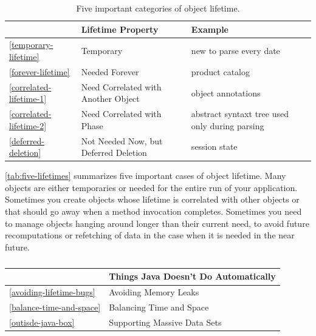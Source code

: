 \begin{table}
\centering
	\begin{tabular}{lp{}p{}}
	\toprule  & Lifetime Property & Example \\ \midrule
	\autoref{temporary-lifetime}  & {Temporary} & new
	\class{SimpleDateFormat} to parse every date
	\\
	\autoref{forever-lifetime} & {Needed Forever} & product catalog
	\\
	\autoref{correlated-lifetime-1} & {Need Correlated with Another Object}
	& object annotations
	\\
	\autoref{correlated-lifetime-2} & {Need Correlated with Phase} &
	abstract syntaxt tree used only during parsing
	\\
	\autoref{deferred-deletion} & {Not Needed Now, but Deferred Deletion} &
	session state \\
	\bottomrule
	\end{tabular}
	\caption{Five important categories of object lifetime.}
	\label{tab:five-lifetimes}
\end{table}

\autoref{tab:five-lifetimes} summarizes five important cases of object lifetime.
Many objects are either temporaries or needed for
the entire run of your application. Sometimes you create objects whose lifetime
is correlated with other objects or that should go away when a method invocation
completes. Sometimes you need to manage objects hanging around longer than their
current need, to avoid future recomputations or refetching of data in the case
when it is needed in the near future. 


\begin{table}
\centering
	\begin{tabular}{ll} \toprule
    	& Things Java Doesn't Do Automatically \\ \midrule
    	\autoref{avoiding-lifetime-bugs} & {Avoiding Memory Leaks} \\
    	\autoref{balance-time-and-space} & {Balancing Time and Space} \\
    	\autoref{outisde-java-box} & {Supporting Massive Data Sets}  	\\
        \bottomrule
    \end{tabular}
	\caption{}
	\label{}
\end{table}


